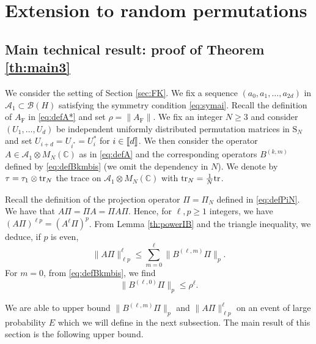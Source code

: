 \documentclass[11pt]{article}
\renewcommand{\star}{{\mathrm{F}}}
\newcommand{\cA}{\mathcal{A}}
\newcommand{\tr}{{\rm tr}}
\newcommand{\dS}{\mathrm{S}}
\newcommand{\dC}{\mathbb {C}}
\newcommand{\cB}{\mathcal{B}}
\newcommand{\1}{1\!\!{\sf I}}
\newcommand{\INT}[1]{{{\left[\hspace{-1.4pt}\left[#1\right]\hspace{-1.4pt}\right]}}}
\begin{document}
\section{Extension to random permutations}

\label{sec:perm}

\subsection{Main technical result: proof of Theorem \ref{th:main3}}
We consider the setting of Section \ref{sec:FK}.  
We fix a sequence $(a_0,a_1, \ldots, a_{2d})$  in $\cA_1 \subset \cB(H)$ satisfying the symmetry condition \eqref{eq:symai}.
 Recall the definition of $A_\star$ in \eqref{eq:defA*} and set 
$
\rho = \| A_\star\|. 
$
We fix an integer $N \geq 3$ and consider $(U_1,\ldots, U_d)$ be independent uniformly distributed permutation matrices in $\dS_N$ and set $U_{i+d}  = U_{i^*} = U_i^*$ for $i \in \INT{d}$. We then consider the operator $A \in \cA_1 \otimes M_N(\dC)$ as in \eqref{eq:defA} and the corresponding operators $B^{(k,m)}$ defined by \eqref{eq:defBkmbis} (we omit the dependency in $N$). We denote by $\tau = \tau_1 \otimes \tr_N$ the trace on $\cA_1 \otimes M_N(\dC)$ with $\tr_N = \frac 1 {N} \tr$. 

Recall the definition of the projection operator $\Pi = \Pi_N$ defined in \eqref{eq:defPiN}. We have that $A \Pi = \Pi A = \Pi A \Pi$. Hence, for $\ell, p \geq 1$ integers,  we have $(A \Pi)^{\ell p} = (A^{\ell} \Pi)^p$.  From Lemma \ref{th:powerIB} and the triangle inequality, we deduce, if $p$ is even,
\begin{equation}\label{eq:normAltrP}
 \| A \Pi\|_{\ell p }^{\ell}  \leq \sum_{m=0}^{\ell} \|  B^{(\ell,m)} \Pi \|_p.
\end{equation}
For $m=0$, from \eqref{eq:defBkmbis}, we find
\begin{equation}\label{eq:Bl0P}
\| B^{(\ell,0)} \Pi \|_p  \leq  \rho^\ell.
\end{equation}

We are able to upper bound $\|  B^{(\ell,m)} \Pi \|_p$ and $ \| A \Pi\|_{\ell p}^{\ell}$ on an event of large probability $E$ which we will define in the next subsection. The main result of this section is the following upper bound.
\end{document}

